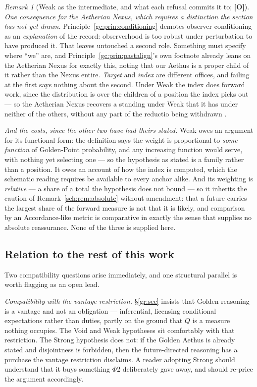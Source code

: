 \documentclass[11pt]{article}
\numberwithin{equation}{section}
\theoremstyle{plain}
\theoremstyle{definition}
\theoremstyle{remark}
\newtheorem{remark}[theorem]{Remark}
\begin{document}
\begin{remark}[Weak as the intermediate, and what each refusal commits
it to; \textbf{[O]}]
\emph{One consequence for the Aetherian Nexus, which requires a
distinction the section has not yet drawn.}
Principle~\ref{gc:prin:conditioning} demotes observer-conditioning as an
\emph{explanation} of the record: observerhood is too robust under
perturbation to have produced it. That leaves untouched a second role.
Something must specify where ``we'' are, and
Principle~\ref{gc:prin:pastalign}'s own footnote already leans on the
Aetherian Nexus for exactly this, noting that our Aethus is a proper
child of it rather than the Nexus entire. \emph{Target} and \emph{index}
are different offices, and failing at the first says nothing about the
second. Under Weak the index does forward work, since the distribution
is over the children of a position the index picks out --- so the
Aetherian Nexus recovers a standing under Weak that it has under neither
of the others, without any part of the reductio being withdrawn
\cite{Nexus}.

\emph{And the costs, since the other two have had theirs stated.} Weak
owes an argument for its functional form: the definition says the weight
is proportional to \emph{some function} of Golden-Point probability, and
any increasing function would serve, with nothing yet selecting one ---
so the hypothesis as stated is a family rather than a position. It owes
an account of how the index is computed, which the schematic reading
requires be available to every anchor alike. And its weighting is
\emph{relative} --- a share of a total the hypothesis does not bound ---
so it inherits the caution of Remark~\ref{sch:rem:absolute} without
amendment: that a future carries the largest share of the forward
measure is not that it is likely, and comparison by an Accordance-like
metric is comparative in exactly the sense that supplies no absolute
reassurance. None of the three is supplied here.
\end{remark}

\subsection{Relation to the rest of this work}\label{gc:sub:relation}

Two compatibility questions arise immediately, and one structural
parallel is worth flagging as an open lead.

\emph{Compatibility with the vantage restriction.}
\S\ref{gr:sec} insists that Golden reasoning is a vantage and not an
obligation --- inferential, licensing conditional expectations rather
than duties, partly on the ground that $Q$ is a measure nothing
occupies. The Void and Weak hypotheses sit comfortably with that
restriction. The Strong hypothesis does not: if the Golden Aethus is
already stated and disjointness is forbidden, then the future-directed
reasoning has a purchase the vantage restriction disclaims. A reader
adopting Strong should understand that it buys something
$\Phi2$ deliberately gave away, and should re-price the argument
accordingly.
\end{document}
